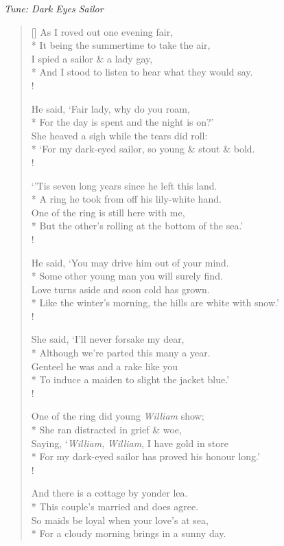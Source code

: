 \documentclass[MAIN]{subfiles}
\begin{document}
\bigskip

\begin{center}
{\it Tune: Dark Eyes Sailor}
\end{center}

\bigskip

\settowidth{\versewidth}{\vin And I stood to listen to hear what they would say.}
\begin{verse}[\versewidth]
As I roved out one evening fair,\\*
\vin It being the summertime to take the air,\\
I spied a sailor \& a lady gay,\\*
\vin And I stood to listen to hear what they would say.\\!

He said, `Fair lady, why do you roam,\\*
\vin For the day is spent and the night is on?'\\
She heaved a sigh while the tears did roll:\\*
\vin `For my dark-eyed sailor, so young \& stout \& bold.\\!

`'Tis seven long years since he left this land.\\*
\vin A ring he took from off his lily-white hand.\\
One  of the ring is still here with me,\\*
\vin But the other's rolling at the bottom of the sea.'\\!

He said, `You may drive him out of your mind.\\*
\vin Some other young man you will surely find.\\
Love turns aside and soon cold has grown.\\*
\vin Like the winter's morning, the hills are white with snow.'\\!

She said, `I'll never forsake my dear,\\*
\vin Although we're parted this many a year.\\
Genteel he was and a rake like you\\*
\vin To induce a maiden to slight the jacket blue.'\\!

One  of the ring did young \emph{William} show;\\*
\vin She ran distracted in grief \& woe,\\
Saying, `\emph{William}, \emph{William}, I have gold in store\\*
\vin For my dark-eyed sailor has proved his honour long.'\\!

And there is a cottage by yonder lea.\\*
\vin This couple's married and does agree.\\
So maids be loyal when your love's at sea,\\*
\vin For a cloudy morning brings in a sunny day.
\end{verse}
\end{document}
